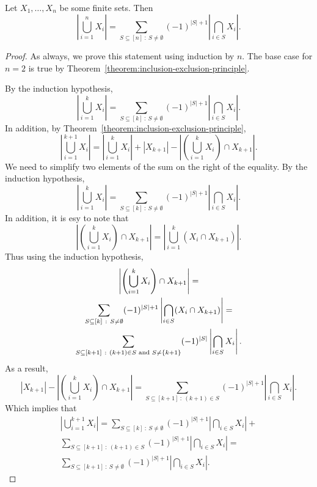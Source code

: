 \begin{corollary}
\label{corollary:inclusion-exclusion-principle}
  Let $X_1, \dots, X_n$ be some finite sets. Then
  \[
    \left|\bigcup_{i = 1}^n X_i\right| =
    \sum_{S \subseteq [n] ~:~ S \neq \emptyset} (-1)^{|S| + 1}
      \left|\bigcap_{i \in S} X_i\right|.
  \]
\end{corollary}
\begin{proof}
  As always, we prove this statement using induction by $n$. The base case for
  $n = 2$ is true by Theorem~\ref{theorem:inclusion-exclusion-principle}.

  By the induction hypothesis,
  \[
    \left|\bigcup_{i = 1}^k X_i\right| =
    \sum_{S \subseteq [k] ~:~ S \neq \emptyset} (-1)^{|S| + 1}
      \left|\bigcap_{i \in S} X_i\right|.
  \]
  In addition, by Theorem~\ref{theorem:inclusion-exclusion-principle},
  \[
    \left|\bigcup_{i = 1}^{k + 1} X_i\right| =
    \left|\bigcup_{i = 1}^k X_i\right| + |X_{k + 1}| -
      \left|\left(\bigcup_{i = 1}^k X_i\right) \cap X_{k + 1}\right|.
  \]
  We need to simplify two elements of the sum on the right of the equality.
  By the induction hypothesis,
  \[
    \left|\bigcup_{i = 1}^k X_i\right| =
      \sum_{S \subseteq [k] ~:~ S \neq \emptyset}
        (-1)^{|S| + 1}
        \left|
          \bigcap_{i \in S} X_i
        \right|.
  \]
  In addition, it is esy to note that
  \[
    \left|\left(\bigcup_{i = 1}^k X_i\right) \cap X_{k + 1}\right| =
    \left|\bigcup_{i = 1}^k \left(X_i \cap X_{k + 1}\right)\right|.
  \]
  Thus using the induction hypothesis,
  \begin{multline*}
    \left|\left(\bigcup_{i = 1}^k X_i\right) \cap X_{k + 1}\right| = \\
    \sum_{S \subseteq [k] ~:~ S \neq \emptyset}
          (-1)^{|S| + 1}
          \left|
            \bigcap_{i \in S} (X_i \cap X_{k + 1})
          \right| = \\
    \sum_{S \subseteq [k + 1] ~:~ (k + 1) \in S \text{ and } S \neq \set{k + 1}}
          (-1)^{|S|} \left|\bigcap_{i \in S} X_i \right|.
  \end{multline*}
  As a result,
  \[
    |X_{k + 1}| -
      \left|\left(\bigcup_{i = 1}^k X_i\right) \cap X_{k + 1}\right| =
    \sum_{S \subseteq [k + 1] ~:~ (k + 1) \in S}
          (-1)^{|S| + 1} \left|\bigcap_{i \in S} X_i \right|.
  \]
  Which implies that
  \begin{multline*}
    \left|\bigcup_{i = 1}^{k + 1} X_i\right| =
    \sum_{S \subseteq [k] ~:~ S \neq \emptyset}
      (-1)^{|S| + 1}
      \left|
        \bigcap_{i \in S} X_i
      \right| + \\
    \sum_{S \subseteq [k + 1] ~:~ (k + 1) \in S}
          (-1)^{|S| + 1} \left|\bigcap_{i \in S} X_i \right| = \\
    \sum_{S \subseteq [k + 1] ~:~ S \neq \emptyset}
      (-1)^{|S| + 1}
      \left|
        \bigcap_{i \in S} X_i
      \right|.
  \end{multline*}
\end{proof}


